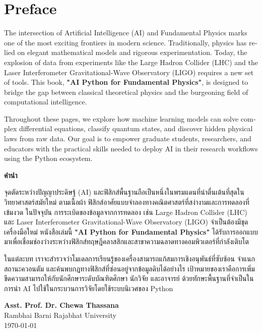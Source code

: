 \chapter*{Preface}

\begin{english}
The intersection of Artificial Intelligence (AI) and Fundamental Physics marks one of the most exciting frontiers in modern science. Traditionally, physics has relied on elegant mathematical models and rigorous experimentation. Today, the explosion of data from experiments like the Large Hadron Collider (LHC) and the Laser Interferometer Gravitational-Wave Observatory (LIGO) requires a new set of tools. This book, \textbf{"AI Python for Fundamental Physics"}, is designed to bridge the gap between classical theoretical physics and the burgeoning field of computational intelligence.

Throughout these pages, we explore how machine learning models can solve complex differential equations, classify quantum states, and discover hidden physical laws from raw data. Our goal is to empower graduate students, researchers, and educators with the practical skills needed to deploy AI in their research workflows using the Python ecosystem.
\end{english}

\vspace{1cm}

\begin{thai}
\textbf{คำนำ}

จุดตัดระหว่างปัญญาประดิษฐ์ (AI) และฟิสิกส์พื้นฐานถือเป็นหนึ่งในพรมแดนที่น่าตื่นเต้นที่สุดในวิทยาศาสตร์สมัยใหม่ ตามเนื้อผ้า ฟิสิกส์อาศัยแบบจำลองทางคณิตศาสตร์ที่สง่างามและการทดลองที่เข้มงวด ในปัจจุบัน การระเบิดของข้อมูลจากการทดลอง เช่น Large Hadron Collider (LHC) และ Laser Interferometer Gravitational-Wave Observatory (LIGO) จำเป็นต้องมีชุดเครื่องมือใหม่ หนังสือเล่มนี้ \textbf{"AI Python for Fundamental Physics"} ได้รับการออกแบบมาเพื่อเชื่อมช่องว่างระหว่างฟิสิกส์ทฤษฎีคลาสสิกและสาขาความฉลาดทางคอมพิวเตอร์ที่กำลังเติบโต

ในแต่ละบท เราจะสำรวจว่าโมเดลการเรียนรู้ของเครื่องสามารถแก้สมการเชิงอนุพันธ์ที่ซับซ้อน จำแนกสถานะควอนตัม และค้นพบกฎทางฟิสิกส์ที่ซ่อนอยู่จากข้อมูลดิบได้อย่างไร เป้าหมายของเราคือการเพิ่มขีดความสามารถให้กับนักศึกษาระดับบัณฑิตศึกษา นักวิจัย และอาจารย์ ด้วยทักษะพื้นฐานที่จำเป็นในการนำ AI ไปใช้ในกระบวนการวิจัยโดยใช้ระบบนิเวศของ Python
\end{thai}

\vfill
\noindent \textbf{Asst. Prof. Dr. Chewa Thassana} \\
Rambhai Barni Rajabhat University \\
\today
